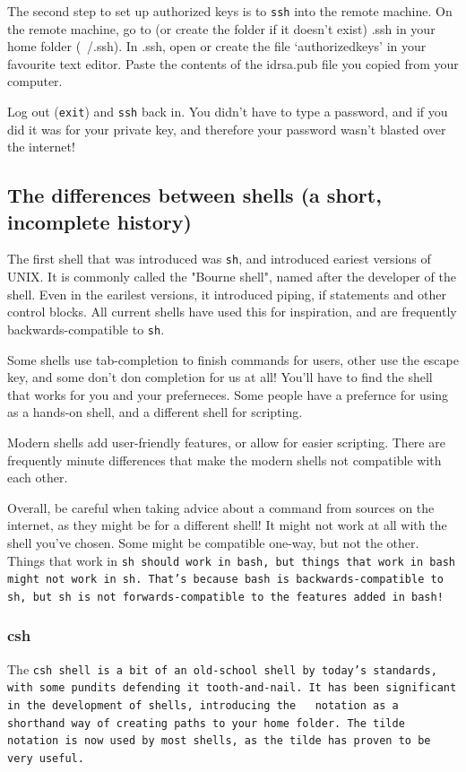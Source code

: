 The second step to set up authorized keys is to {\tt ssh} into the remote machine.
On the remote machine, go to (or create the folder if it doesn't exist) .ssh 
in your home folder (~/.ssh). In .ssh, open or create the file `authorized\textunderscore keys'
in your favourite text editor.
Paste the contents of the id\textunderscore rsa.pub file you copied from your computer.

Log out ({\tt exit}) and {\tt ssh} back in. You didn't have to type a password, and
if you did it was for your private key, and therefore your password wasn't blasted
over the internet!

\subsection{The differences between shells (a short, incomplete history)}
The first shell that was introduced was {\tt sh}, and introduced eariest versions of UNIX.
It is commonly called the "Bourne shell", named after the developer of the shell.
Even in the earilest versions, it introduced piping, if statements and other control blocks.
All current shells have used this for inspiration, and are frequently backwards-compatible to
 {\tt sh}.

Some shells use tab-completion to finish commands for users, other use the escape key,
and some don't don completion for us at all! You'll have to find the shell that works
for you and your preferneces. Some people have a prefernce for using as a hands-on shell, and
a different shell for scripting.

 Modern shells add user-friendly features, or allow for easier scripting. There are frequently
 minute differences that make the modern shells not compatible with each other.

 Overall, be careful when taking advice about a command from sources on the internet,
 as they might be for a different shell! It might not work at all with the shell you've chosen. Some might
 be compatible one-way, but not the other. Things that work in \tt{sh} should work in \tt{bash}, but
 things that work in \tt{bash} might not work in \tt{sh}. That's because \tt{bash} is backwards-compatible
 to \tt{sh}, but \tt{sh} is not forwards-compatible to the features added in \tt{bash}!

 \subsubsection{csh}
 The \tt{csh} shell is a bit of an old-school shell by today's standards, with some
 pundits defending it tooth-and-nail. It has been significant in the development of
 shells, introducing the \tt{~} notation as a shorthand way of creating paths
 to your home folder. The tilde notation is now used by most shells, as the tilde
has proven to be very useful.

